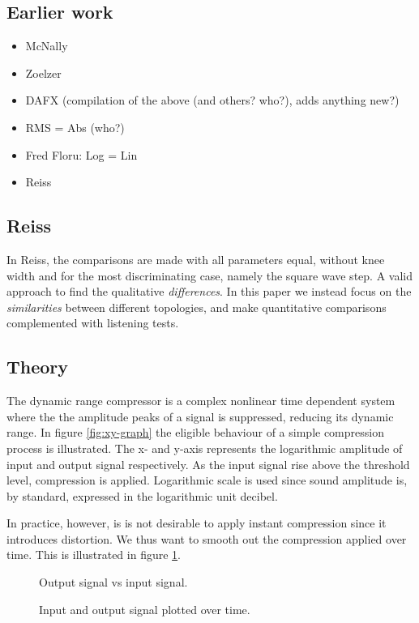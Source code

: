 \documentclass[../main2.tex]{subfiles}
\begin{document}
\subsection{Earlier work}

\begin{itemize}
\item McNally
\item Zoelzer
\item DAFX (compilation of the above (and others? who?), adds anything new?)
\item RMS = Abs (who?)
\item Fred Floru: Log = Lin
\item Reiss
\end{itemize}

\subsection{Reiss}
In Reiss, the comparisons are made with all parameters equal, without knee width and for the most discriminating case, namely the square wave step. A valid approach to find the qualitative \emph{differences}. In this paper we instead focus on the \emph{similarities} between different topologies, and make quantitative comparisons complemented with listening tests.

\subsection{Theory}
The dynamic range compressor is a complex nonlinear time dependent system where the the amplitude peaks of a signal is suppressed, reducing its dynamic range. In figure \ref{fig:xy-graph} the eligible behaviour of a simple compression process is illustrated. The x- and y-axis represents the logarithmic amplitude of input and output signal respectively. As the input signal rise above the threshold level, compression is applied. Logarithmic scale is used since sound amplitude is, by standard, expressed in the logarithmic unit decibel.

In practice, however, is is not desirable to apply instant compression since it introduces distortion\cite{giannoullis}. We thus want to smooth out the compression applied over time. This is illustrated in figure \ref{fig:envelope-graph}.

\begin{figure}[ht]
\captionsetup{justification=centering}
\begin{minipage}[t]{.5\textwidth}
 \centering

\caption{Output signal vs input signal.} 
\label{fig:xy-graph}
\end{minipage}%
\begin{minipage}[t]{.5\textwidth}
\centering

\caption{Input and output signal plotted over time. } 
\label{fig:envelope-graph}
\end{minipage}
\end{figure}
\end{document}
